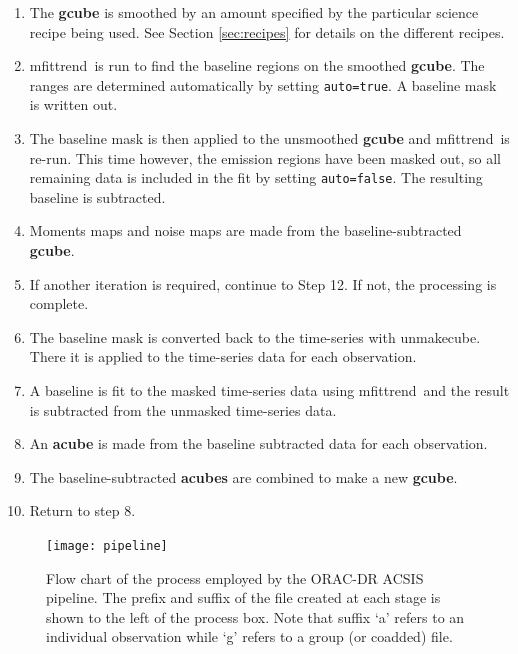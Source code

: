 \documentclass[twoside,11pt]{article}
\newcommand{\xref}[3]{#1}
\renewcommand{\_}{\texttt{\symbol{95}}}
\newcommand{\task}[1]{\textsf{#1}}
\newcommand{\param}[1]{\texttt{#1}}
\newcommand{\unmakecube}{\xref{\task{unmakecube}}{sun258}{UNMAKECUBE}}
\newcommand{\mfittrend}{\xref{\task{mfittrend}}{sun95}{MFITTREND}}
\begin{document}
\begin{enumerate}[label=(\textbf{\arabic*})]
\item  The \textbf{g\_cube} is smoothed by an amount specified by the particular science recipe being used. See Section \ref{sec:recipes} for details on the different recipes.

\item   \mfittrend\ is run to find the baseline regions on the smoothed \textbf{g\_cube}. The ranges are determined automatically by setting \param{auto=true}. A baseline mask is written out.

\item  The baseline mask is then applied to the unsmoothed \textbf{g\_cube} and \mfittrend\ is re-run. This time however, the emission regions have been masked out, so all remaining data is included in the fit by setting \param{auto=false}. The resulting baseline is subtracted.

\item  Moments maps and noise maps are made from the baseline-subtracted \textbf{g\_cube}.

\item If another iteration is required, continue to Step 12. If not, the processing is complete.

\item  The baseline mask is converted back to the time-series with \unmakecube. There it is applied to the time-series data for each observation.

\item   A baseline is fit to the masked time-series data using \mfittrend\ and the result is subtracted from the unmasked time-series data.

\item   An \textbf{a\_cube} is made from the baseline subtracted data for each observation.

\item   The baseline-subtracted \textbf{a\_cubes} are combined to make a new \textbf{g\_cube}.

\item  Return to step 8.
\end{enumerate}

\setlength{\intextsep}{10.0pt plus 1.0pt minus 2.0pt}
\begin{figure}[h!]
\begin{center}
\texttt{[image: pipeline]}
\label{fig:pipeline}
\caption[Flow chart of the ORAC-DR ACSIS pipeline process.]{Flow chart of the process employed by the ORAC-DR ACSIS pipeline. The prefix and suffix of the file created at each stage is shown to the left of the process box. Note that suffix `a' refers to an individual observation while `g' refers to a group (or coadded) file.}
\end{center}
\end{figure}
\setlength{\textfloatsep}{20pt plus 1.0pt minus 2.0pt}
\end{document}
